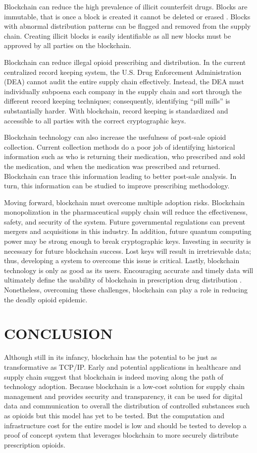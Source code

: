 \documentclass[sigconf]{acmart}
\begin{document}
Blockchain can reduce the high prevalence of illicit counterfeit drugs. Blocks are immutable, that is once a block is created it cannot be deleted or erased \cite{hitchingHealthcare}. Blocks with abnormal distribution patterns can be flagged and removed from the supply chain. Creating illicit blocks is easily identifiable as all new blocks must be approved by all parties on the blockchain. 

Blockchain can reduce illegal opioid prescribing and distribution. In the current centralized record keeping system, the U.S. Drug Enforcement Administration (DEA) cannot audit the entire supply chain effectively. Instead, the DEA must individually subpoena each company in the supply chain and sort through the different record keeping techniques; consequently, identifying ``pill mills'' is substantially harder. With blockchain, record keeping is standardized and accessible to all parties with the correct cryptographic keys. 

Blockchain technology can also increase the usefulness of post-sale opioid collection. Current collection methods do a poor job of identifying historical information such as who is returning their medication, who prescribed and sold the medication, and when the medication was prescribed and returned. Blockchain can trace this information leading to better post-sale analysis. In turn, this information can be studied to improve prescribing methodology. 

Moving forward, blockchain must overcome multiple adoption risks. Blockchain monopolization in the pharmaceutical supply chain will reduce the effectiveness, safety, and security of the system. Future governmental regulations can prevent mergers and acquisitions in this industry. In addition, future quantum computing power may be strong enough to break cryptographic keys. Investing in security is necessary for future blockchain success. Lost keys will result in irretrievable data; thus, developing a system to overcome this issue is critical. Lastly, blockchain technology is only as good as its users. Encouraging accurate and timely data will ultimately define the usability of blockchain in prescription drug distribution \cite{hitchingHealthcare}. Nonetheless, overcoming these challenges, blockchain can play a role in reducing the deadly opioid epidemic. 

\section{CONCLUSION}
Although still in its infancy, blockchain has the potential to be just as transformative as TCP/IP. Early and potential applications in healthcare and supply chain suggest that blockchain is indeed moving along the path of technology adoption. Because blockchain is a low-cost solution for supply chain management and provides security and transparency, it can be used for digital data and communication to overall the distribution of controlled substances such as opioids but this model has yet to be tested. But the computation and infrastructure cost for the entire model is low and should be tested to develop a proof of concept system that leverages blockchain to more securely distribute prescription opioids.
\end{document}
